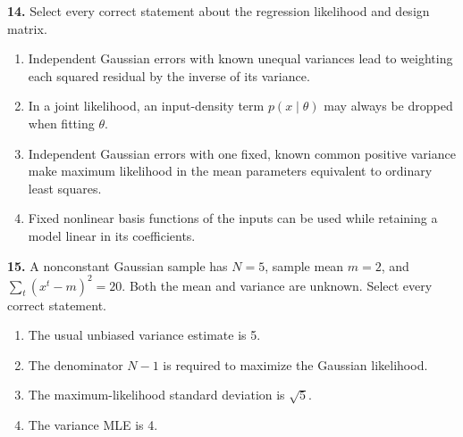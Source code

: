 \documentclass[11pt,a4paper]{article}
\begin{document}
\par\noindent\begin{minipage}{\linewidth}
\textbf{14.} Select every correct statement about the regression likelihood and design matrix.
\begin{enumerate}[label=(\Alph*),leftmargin=8mm,itemsep=2pt,topsep=2pt]
\item Independent Gaussian errors with known unequal variances lead to weighting each squared residual by the inverse of its variance.
\item In a joint likelihood, an input-density term \(p(x\mid\theta)\) may always be dropped when fitting \(\theta\).
\item Independent Gaussian errors with one fixed, known common positive variance make maximum likelihood in the mean parameters equivalent to ordinary least squares.
\item Fixed nonlinear basis functions of the inputs can be used while retaining a model linear in its coefficients.
\end{enumerate}

\end{minipage}\par\vspace{3mm}
\par\noindent\begin{minipage}{\linewidth}
\textbf{15.} A nonconstant Gaussian sample has \(N=5\), sample mean \(m=2\), and \(\sum_t(x^t-m)^2=20\). Both the mean and variance are unknown. Select every correct statement.
\begin{enumerate}[label=(\Alph*),leftmargin=8mm,itemsep=2pt,topsep=2pt]
\item The usual unbiased variance estimate is 5.
\item The denominator \(N-1\) is required to maximize the Gaussian likelihood.
\item The maximum-likelihood standard deviation is \(\sqrt5\).
\item The variance MLE is 4.
\end{enumerate}

\end{minipage}\par\vspace{3mm}
\end{document}
